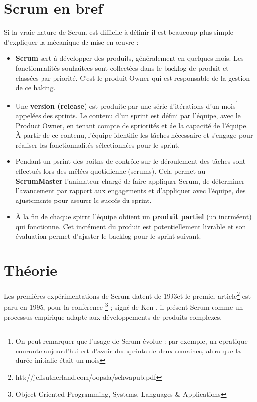 \documentclass[12pt,a4paper,openany]{article}
\begin{document}
	\section*{Scrum en bref}
	Si la vraie nature de Scrum est difficile à définir il est beaucoup plus simple d'expliquer la mécanique de mise en \oe{}uvre :
	\begin{itemize}
		\item \textbf{Scrum} sert à développer des produits, généralement en quelques mois. Les fonctionnalités souhaitées sont collectées dans le backlog de produit et classées
			par priorité. C'est le produit Owner qui est responsable de la gestion de ce haking.
		\item Une \textbf{version (release)} est produite par une série d'itérations d'un mois\footnote{On peut remarquer que l'usage de Scrum évolue : par exemple, un epratique courante aujourd'hui est
			d'avoir des sprints de deux semaines, alors que la durée initialie était un mois} appelées des sprints. Le contenu d'un sprint est défini par l'équipe, avec le Product Owner, 
			en tenant compte de spriorités et de la capacité de l'équipe. À partir de ce contenu, l'équipe identifie les tâches nécessaire et s'engage pour réaliser
			les fonctionnalités sélectionnées pour le sprint.
		\item Pendant un psrint des poitns de contrôle sur le déroulement des tâches sont effectués lors des mêlées quotidienne (scrums). Cela permet au \textbf{ScrumMaster} l'animateur chargé de faire
			appliquer Scrum, de déterminer l'avancement par rapport aux engagements et d'appliquer avec l'équipe, des ajustements pour assurer le succés du sprint.
		\item À la fin de chaque spirnt l'équipe obtient un \textbf{produit partiel} (un incrméent) qui fonctionne. Cet incrément du produit est potentiellement livrable et son
			évaluation permet d'ajuster le backlog pour le sprint suivant.
	\end{itemize}
	\section{Théorie}
	Les premières expérimentations de Scrum datent de 1993et le premier article\footnote{htt://jeffsutherland.com/oopsla/schwapub.pdf} est paru en 1995, pour la conférence \footnote{Object-Oriented Programming,
	Systems, Languages \& Applications} ; signé de Ken , il présent Scrum comme un processus empirique adapté aux développements de produits complexes.
\end{document}
